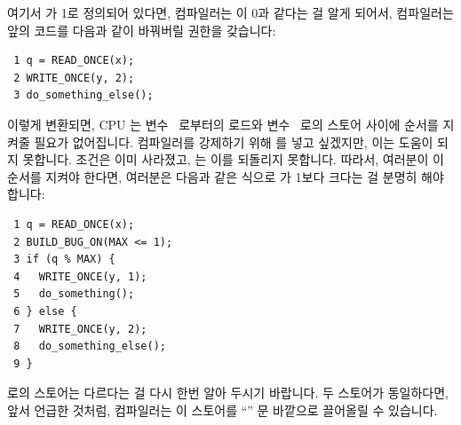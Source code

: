 여기서  가 1로 정의되어 있다면, 컴파일러는  이 0과 같다는
걸 알게 되어서, 컴파일러는 앞의 코드를 다음과 같이 바꿔버릴 권한을 갖습니다:

\vspace{5pt}
\begin{minipage}[t]{\columnwidth}
\scriptsize
\begin{verbatim}
 1 q = READ_ONCE(x);
 2 WRITE_ONCE(y, 2);
 3 do_something_else();
\end{verbatim}
\end{minipage}
\vspace{5pt}

이렇게 변환되면, CPU 는 변수~ 로부터의 로드와 변수~ 로의 스토어
사이에 순서를 지켜줄 필요가 없어집니다.
컴파일러를 강제하기 위해  를 넣고 싶겠지만, 이는 도움이 되지
못합니다.
조건은 이미 사라졌고,  는 이를 되돌리지 못합니다.
따라서, 여러분이 이 순서를 지켜야 한다면, 여러분은 다음과 같은 식으로 
가 1보다 크다는 걸 분명히 해야 합니다:

\vspace{5pt}
\begin{minipage}[t]{\columnwidth}
\scriptsize
\begin{verbatim}
 1 q = READ_ONCE(x);
 2 BUILD_BUG_ON(MAX <= 1);
 3 if (q % MAX) {
 4   WRITE_ONCE(y, 1);
 5   do_something();
 6 } else {
 7   WRITE_ONCE(y, 2);
 8   do_something_else();
 9 }
\end{verbatim}
\end{minipage}
\vspace{5pt}

 로의 스토어는 다르다는 걸 다시 한번 알아 두시기 바랍니다.
두 스토어가 동일하다면, 앞서 언급한 것처럼, 컴파일러는 이 스토어를 ``''
문 바깥으로 끌어올릴 수 있습니다.

